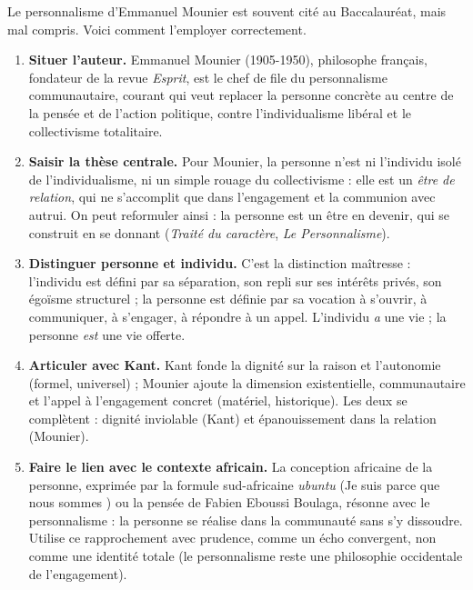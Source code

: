 \documentclass[11pt]{article}
\newcommand{\cle}[1]{{\popxbold\color{popdark}#1}}
\begin{document}
\begin{methode}
Le personnalisme d'Emmanuel Mounier est souvent cité au Baccalauréat, mais mal compris. Voici comment l'employer correctement.
\begin{enumerate}
\item \textbf{Situer l'auteur.} Emmanuel Mounier (1905-1950), philosophe français, fondateur de la revue \emph{Esprit}, est le chef de file du \cle{personnalisme communautaire}, courant qui veut replacer la personne concrète au centre de la pensée et de l'action politique, contre l'individualisme libéral et le collectivisme totalitaire.
\item \textbf{Saisir la thèse centrale.} Pour Mounier, la personne n'est ni l'individu isolé de l'individualisme, ni un simple rouage du collectivisme : elle est un \emph{être de relation}, qui ne s'accomplit que dans l'engagement et la communion avec autrui. On peut reformuler ainsi : la personne est un être en devenir, qui se construit en se donnant (\emph{Traité du caractère}, \emph{Le Personnalisme}).
\item \textbf{Distinguer personne et individu.} C'est la distinction maîtresse : l'\cle{individu} est défini par sa séparation, son repli sur ses intérêts privés, son égoïsme structurel ; la \cle{personne} est définie par sa vocation à s'ouvrir, à communiquer, à s'engager, à répondre à un appel. L'individu \emph{a} une vie ; la personne \emph{est} une vie offerte.
\item \textbf{Articuler avec Kant.} Kant fonde la dignité sur la raison et l'autonomie (formel, universel) ; Mounier ajoute la dimension existentielle, communautaire et l'appel à l'engagement concret (matériel, historique). Les deux se complètent : dignité inviolable (Kant) et épanouissement dans la relation (Mounier).
\item \textbf{Faire le lien avec le contexte africain.} La conception africaine de la personne, exprimée par la formule sud-africaine \emph{ubuntu} (\guillemotleft Je suis parce que nous sommes \guillemotright) ou la pensée de Fabien Eboussi Boulaga, résonne avec le personnalisme : la personne se réalise dans la communauté sans s'y dissoudre. Utilise ce rapprochement avec prudence, comme un écho convergent, non comme une identité totale (le personnalisme reste une philosophie occidentale de l'engagement).
\end{enumerate}
\end{methode}
\end{document}

